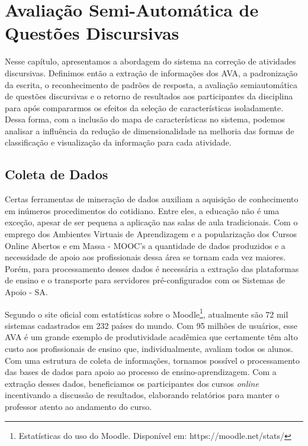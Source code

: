 \chapter{Avaliação Semi-Automática de Questões Discursivas}\label{cap3}
Nesse capítulo, apresentamos a abordagem do sistema na correção de atividades discursivas. Definimos então a extração de informações dos AVA, a padronização da escrita, o reconhecimento de padrões de resposta, a avaliação semiautomática de questões discursivas e o retorno de resultados aos participantes da disciplina para após compararmos os efeitos da seleção de características isoladamente. Dessa forma, com a inclusão do mapa de características no sistema, podemos analisar a influência da redução de dimensionalidade na melhoria das formas de classificação e visualização da informação para cada atividade.

\section{Coleta de Dados}

Certas ferramentas de mineração de dados auxiliam a aquisição de conhecimento em inúmeros procedimentos do cotidiano. Entre eles, a educação não é uma exceção, apesar de ser pequena a aplicação nas salas de aula tradicionais. Com o emprego dos Ambientes Virtuais de Aprendizagem e a popularização dos Cursos Online Abertos e em Massa - MOOC's a quantidade de dados produzidos e a necessidade de apoio aos profissionais dessa área se tornam cada vez maiores. Porém, para processamento desses dados é necessária a extração das plataformas de ensino e o transporte para servidores pré-configurados com os Sistemas de Apoio - SA.

Segundo o site oficial com estatísticas sobre o Moodle\footnote{Estatísticas do uso do Moodle. Disponível em: https://moodle.net/stats/}, atualmente são 72 mil sistemas cadastrados em 232 países do mundo. Com 95 milhões de usuários, esse AVA é um grande exemplo de produtividade acadêmica que certamente têm alto custo aos profissionais de ensino que, individualmente, avaliam todos os alunos. Com uma estrutura de coleta de informações, tornamos possível o processamento das bases de dados para apoio ao processo de ensino-aprendizagem. Com a extração desses dados, beneficiamos os participantes dos cursos \textit{online} incentivando a discussão de resultados, elaborando relatórios para manter o professor atento ao andamento do curso.

